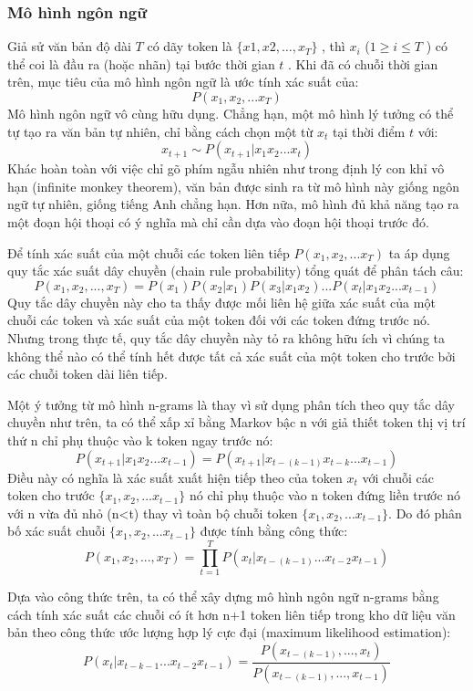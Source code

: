 \documentclass[a4paper]{article}
\theoremstyle{definition}
\begin{document}
\subsubsection{Mô hình ngôn ngữ}
Giả sử văn bản độ dài  $T$  có dãy token là  $\{x1,x2,…,x_T\}$ , thì  $x_i$ ($1\geq i \leq T$ ) có thể coi là đầu ra (hoặc nhãn) tại bước thời gian  $t$ . Khi đã có chuỗi thời gian trên, mục tiêu của mô hình ngôn ngữ là ước tính xác suất của:
$$P(x_1, x_2, ...x_T)$$
Mô hình ngôn ngữ vô cùng hữu dụng. Chẳng hạn, một mô hình lý tưởng có thể tự tạo ra văn bản tự nhiên, chỉ bằng cách chọn một từ  $x_t$  tại thời điểm  $t$  với:
$$x_{t+1} \sim P(x_{t+1}|x_1x_2...x_t)$$
Khác hoàn toàn với việc chỉ gõ phím ngẫu nhiên như trong định lý con khỉ vô hạn (infinite monkey theorem), văn bản được sinh ra từ mô hình này giống ngôn ngữ tự nhiên, giống tiếng Anh chẳng hạn. Hơn nữa, mô hình đủ khả năng tạo ra một đoạn hội thoại có ý nghĩa mà chỉ cần dựa vào đoạn hội thoại trước đó.

Để tính xác suất của một chuỗi các token liên tiếp $P(x_1, x_2, ...x_T)$  ta áp dụng quy tắc xác suất dây chuyền (chain rule probability) tổng quát để phân tách câu: 
$$P(x_1, x_2,..., x_T) = P(x_1)P(x_2|x_1)P(x_3|x_1x_2) ... P(x_{t}|x_1x_2...x_{t-1})$$
Quy tắc dây chuyền này cho ta thấy được mối liên hệ giữa xác suất của một chuỗi các token và xác suất của một token đối với các token đứng trước nó. Nhưng trong thực tế, quy tắc dây chuyền này tỏ ra không hữu ích vì chúng ta không thể nào có thể tính hết được tất cả xác suất của một token cho trước bởi các chuỗi token dài liên tiếp.

Một ý tưởng từ mô hình n-grams là thay vì sử dụng phân tích theo quy tắc dây chuyền như trên, ta có thể xấp xỉ bằng Markov bậc n với giả thiết token thị vị trí thứ n chỉ phụ thuộc vào k token ngay trước nó: 
$$P(x_{t+1}|x_1x_2...x_{t-1}) =  P(x_{t+1}|x_{t-(k-1)}x_{t-k}...x_{t-1})$$
Điều này có nghĩa là xác  suất xuất hiện tiếp theo của token $x_t$ với chuỗi các token cho trước $\{x_1, x_2,...x_{t-1}\}$ nó chỉ phụ thuộc vào n token đứng liền trước nó với n vừa đủ nhỏ (n<t) thay vì toàn bộ chuỗi token $\{x_1, x_2,...x_{t-1}\}$. Do đó phân bố xác suất chuỗi $\{x_1, x_2,...x_{t-1}\}$ được tính bằng công thức: 
$$P(x_1, x_2,..., x_T) = \prod_{t=1}^{T} P(x_{t}|x_{t-(k-1)}...x_{t-2}x_{t-1})$$

Dựa vào công thức trên, ta có thể xây dựng mô hình ngôn ngữ n-grams bằng cách tính xác suất các chuỗi có ít hơn n+1 token liên tiếp trong kho dữ liệu văn bản theo công thức ước lượng hợp lý cực đại (maximum likelihood estimation): 
$$P(x_{t}|x_{t-k-1}...x_{t-2}x_{t-1}) = \frac{P(x_{t-(k-1)}, ..., x_t) }{P(x_{t-(k-1)}, ..., x_{t-1})}$$
\end{document}
